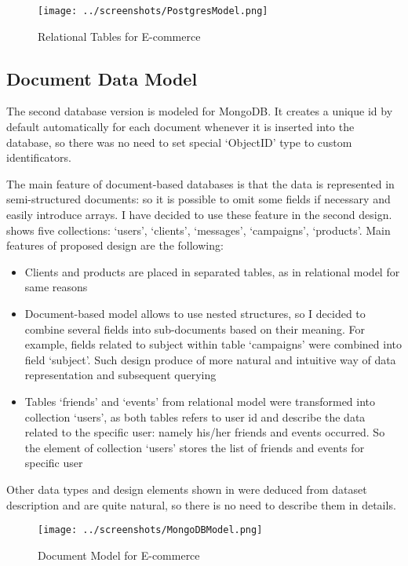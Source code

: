 \documentclass[conference]{IEEEtran}
\begin{document}
\begin{figure}[htbp]
    \centerline{\texttt{[image: ../screenshots/PostgresModel.png]}}
    \caption{Relational Tables for E-commerce}\label{fig:postgres_model}
\end{figure}


\subsection{Document Data Model}
The second database version is modeled for MongoDB.  It creates a unique id by default automatically for each document whenever it is inserted into the database, so there was no need to set special `ObjectID' type to custom identificators.

The main feature of document-based databases is that the data is represented in semi-structured documents: so it is possible to omit some fields if necessary and easily introduce arrays. I have decided to use these feature in the second design.  shows five collections: `users', `clients', `messages', `campaigns', `products'. Main features of proposed design are the following:
\begin{itemize}
    \item Clients and products are placed in separated tables, as in relational model for same reasons
    \item Document-based model allows to use nested structures, so I decided to combine several fields into sub-documents based on their meaning. For example, fields related to subject within table `campaigns' were combined into field `subject'. Such design produce of more natural and intuitive way of data representation and subsequent querying
    \item Tables `friends' and `events' from relational model were transformed into collection `users', as both tables refers to user id and describe the data related to the specific user: namely his/her friends and events occurred. So the element of collection `users' stores the list of friends and events for specific user
\end{itemize}
Other data types and design elements shown in  were deduced from dataset description and are quite natural, so there is no need to describe them in details.

\begin{figure}[htbp]
    \centerline{\texttt{[image: ../screenshots/MongoDBModel.png]}}
    \caption{Document Model for E-commerce}\label{fig:mongo_model}
\end{figure}
\end{document}

